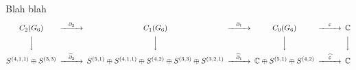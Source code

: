 \documentclass[final,xcolor=svgnames]{beamer}
\begin{document}
\begin{frame}{}
  \begin{block}{Blah blah}
    \[
    \begin{CD}
      C_{2}(G_{6}) @>{\partial_{2}}>> C_{1}(G_{6}) @>{\partial_{1}}>> C_{0}(G_{6}) @>{\varepsilon}>> \mathbb{C}\\
      @VVV   @VVV   @VVV   @VVV    \\
      S^{(4,1,1)}\oplus S^{(3,3)} @>{\widehat\partial_{2}}>>
      S^{(5,1)}\oplus S^{(4,1,1)}\oplus S^{(4,2)}\oplus S^{(3,3)}\oplus S^{(3,2,1)} @>{\widehat\partial_{1}}>> 
      \mathbb{C} \oplus S^{(5,1)}\oplus S^{(4,2)} @>{\widehat \varepsilon}>>  \mathbb{C}
    \end{CD}
    \]
  \end{block}
\end{frame}
\end{document}
